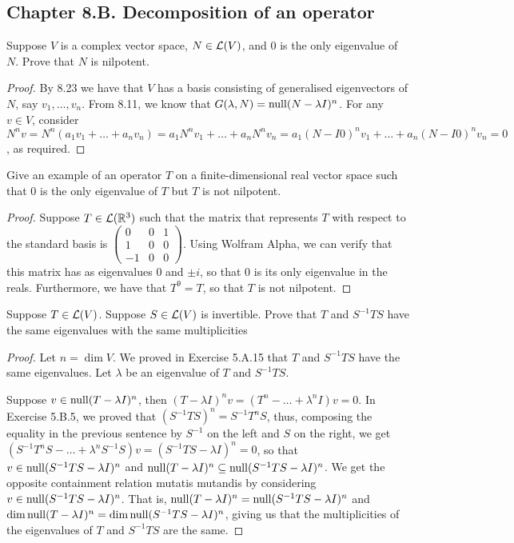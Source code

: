 \subsection*{Chapter 8.B. Decomposition of an operator}


\begin{exercise}{1}
  Suppose $V$ is a complex vector space, $N\in\mathcal{L}(V)$, and 0 is the only eigenvalue of $N$. Prove that $N$ is nilpotent.
\end{exercise}
\begin{proof}
 By 8.23 we have that $V$ has a basis consisting of generalised eigenvectors of $N$, say $v_1,\dots,v_n$. From 8.11, we know that $G(\lambda, N)=\operatorname*{null}(N-\lambda I)^n$. For any $v\in V$, consider $N^nv =N^n(a_1v_1+\dots+a_nv_n) =a_1N^nv_1+\dots+a_nN^nv_n=a_1(N-I0)^nv_1+\dots+a_n(N-I0)^nv_n =0$, as required.
\end{proof}

\begin{exercise}{2}
  Give an example of an operator $T$ on a finite-dimensional real vector space such that 0 is the only eigenvalue of $T$ but $T$ is not nilpotent.
\end{exercise}
\begin{proof}
 Suppose $T\in\mathcal{L}(\mathbb{R}^3)$ such that the matrix that represents $T$ with respect to the standard basis is
 $\begin{pmatrix}
 0 & 0 &1\\
 1 & 0 & 0\\
 -1 & 0 &0
 \end{pmatrix}$.
 Using Wolfram Alpha, we can verify that this matrix has as eigenvalues 0 and $\pm i$, so that 0 is its only eigenvalue in the reals. Furthermore, we have that $T^9=T$, so that $T$ is not nilpotent.
\end{proof}

\begin{exercise}{3}
  Suppose $T\in\mathcal{L}(V)$. Suppose $S\in\mathcal{L}(V)$ is invertible. Prove that $T$ and $S^{-1}TS$ have the same eigenvalues with the same multiplicities
\end{exercise}
\begin{proof}
 Let $n=\dim V$. We proved in Exercise 5.A.15 that $T$ and $S^{-1}TS$ have the same eigenvalues. Let $\lambda$ be an eigenvalue of $T$ and $S^{-1}TS$. 

 Suppose $v\in\operatorname*{null}(T-\lambda I)^n$, then $(T-\lambda I)^nv =(T^n-\dots +\lambda^n I)v =0$. In Exercise 5.B.5, we proved that $(S^{-1}TS)^n =S^{-1}T^nS$, thus, composing the equality in the previous sentence by $S^{-1}$ on the left and $S$ on the right, we get $(S^{-1}T^nS-\dots +\lambda^n S^{-1}S)v =(S^{-1}TS-\lambda I)^n =0$, so that $v\in\operatorname*{null}(S^{-1}TS-\lambda I)^n$ and $\operatorname*{null}(T-\lambda I)^n\subseteq \operatorname*{null}(S^{-1}TS-\lambda I)^n$. We get the opposite containment relation mutatis mutandis by considering $v\in\operatorname*{null}(S^{-1}TS-\lambda I)^n$. That is, $\operatorname*{null}(T-\lambda I)^n =\operatorname*{null}(S^{-1}TS-\lambda I)^n$ and $\dim\operatorname*{null}(T-\lambda I)^n =\dim\operatorname*{null}(S^{-1}TS-\lambda I)^n$, giving us that the multiplicities of the eigenvalues of $T$ and $S^{-1}TS$ are the same.
 \end{proof}

